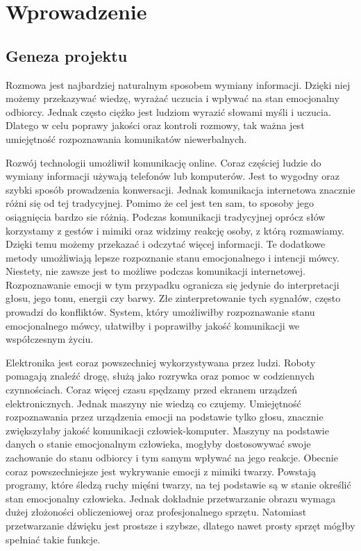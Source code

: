 \documentclass[declaration,shortabstract]{iithesis}
\author         {Elżbieta Plaszczyk}
\begin{document}
\let\cleardoublepage\clearpage
\chapter{Wprowadzenie}
\section{Geneza projektu}
Rozmowa jest najbardziej naturalnym sposobem wymiany informacji. Dzięki niej możemy przekazywać wiedzę, wyrażać uczucia i wpływać na stan emocjonalny odbiorcy.  Jednak często ciężko jest ludziom wyrazić słowami myśli i uczucia. Dlatego w celu poprawy jakości oraz kontroli rozmowy, tak ważna jest umiejętność rozpoznawania komunikatów niewerbalnych. 

Rozwój technologii umożliwił komunikację online. Coraz częściej ludzie do wymiany informacji używają telefonów lub komputerów. Jest to wygodny oraz szybki sposób prowadzenia konwersacji. Jednak komunikacja internetowa znacznie różni się od tej tradycyjnej. Pomimo że cel jest ten sam, to sposoby jego osiągnięcia bardzo sie różnią. Podczas komunikacji tradycyjnej oprócz słów korzystamy z gestów i mimiki oraz widzimy reakcję osoby, z którą rozmawiamy. Dzięki temu możemy przekazać i odczytać więcej informacji. Te dodatkowe metody umożliwiają lepsze rozpoznanie stanu emocjonalnego i intencji mówcy. Niestety, nie zawsze jest to możliwe podczas komunikacji internetowej. Rozpoznawanie emocji w tym przypadku ogranicza się jedynie do interpretacji głosu, jego tonu, energii czy barwy. Złe zinterpretowanie tych sygnałów, często prowadzi do konfliktów. System, który umożliwiłby rozpoznawanie stanu emocjonalnego mówcy, ułatwiłby i poprawiłby jakość komunikacji we współczesnym życiu. 

Elektronika jest coraz powszechniej wykorzystywana przez ludzi. Roboty pomagają znaleźć drogę, służą jako rozrywka oraz pomoc w codziennych czynnościach. Coraz więcej czasu spędzamy przed ekranem urządzeń elektronicznych. Jednak maszyny nie wiedzą co czujemy. Umiejętność rozpoznawania przez urządzenia emocji na podstawie tylko głosu, znacznie zwiększyłaby jakość komunikacji człowiek-komputer. Maszyny na podstawie danych o stanie emocjonalnym człowieka, mogłyby dostosowywać swoje zachowanie do stanu odbiorcy i tym samym wpływać na jego reakcje. Obecnie coraz powszechniejsze jest wykrywanie emocji z mimiki twarzy. Powstają programy, które śledzą ruchy mięśni twarzy, na tej podstawie są w stanie określić stan emocjonalny człowieka. Jednak dokładnie przetwarzanie obrazu wymaga dużej złożoności obliczeniowej oraz profesjonalnego sprzętu. Natomiast przetwarzanie dźwięku jest prostsze i szybsze, dlatego nawet prosty sprzęt mógłby spełniać takie funkcje.
\end{document}
